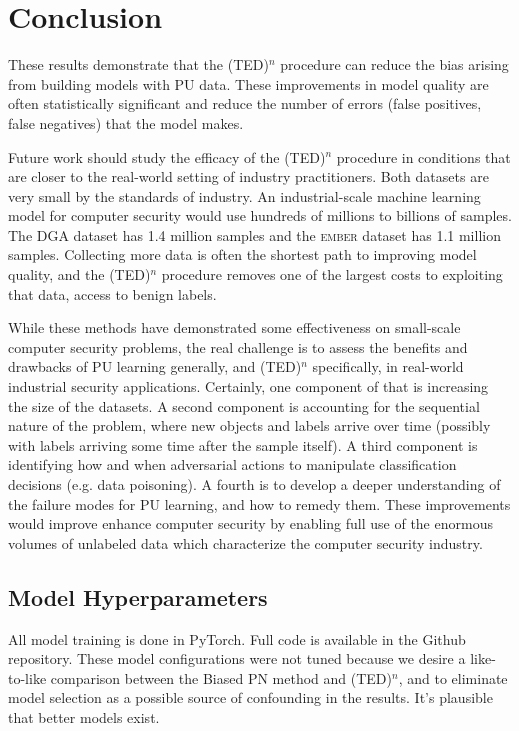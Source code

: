 \documentclass[conference]{IEEEtran}
\begin{document}
\section{Conclusion}
\label{sec:conclude}

    These results demonstrate that the (TED)${}^n$ procedure can reduce the bias arising from building models with PU data. These improvements in model quality are often statistically significant and reduce the number of errors (false positives, false negatives) that the model makes. 

    Future work should study the efficacy of the (TED)${}^n$ procedure in conditions that are closer to the real-world setting of industry practitioners. Both datasets are very small by the standards of industry. An industrial-scale machine learning model for computer security would use hundreds of millions to billions of samples. The DGA dataset has 1.4 million samples and the \textsc{ember} dataset has 1.1 million samples. Collecting more data is often the shortest path to improving model quality, and the (TED)${}^n$ procedure removes one of the largest costs to exploiting that data, access to benign labels.

    While these methods have demonstrated some effectiveness on small-scale computer security problems, the real challenge is to assess the benefits and drawbacks of PU learning generally, and (TED)${}^n$ specifically, in real-world industrial security applications. Certainly, one component of that is increasing the size of the datasets. A second component is accounting for the sequential nature of the problem, where new objects and labels arrive over time (possibly with labels arriving some time after the sample itself). A third component is identifying how and when adversarial actions to manipulate classification decisions (e.g. data poisoning). A fourth is to develop a deeper understanding of the failure modes for PU learning, and how to remedy them. These improvements would improve enhance computer security by enabling full use of the enormous volumes of unlabeled data which characterize the computer security industry.



\appendix

\subsection{Model Hyperparameters}
\label{appendix:hyperparams}
    All model training is done in PyTorch. Full code is available in the Github repository. These model configurations were not tuned because we desire a like-to-like comparison between the Biased PN method and (TED)${}^n$, and to eliminate model selection as a possible source of confounding in the results. It's plausible that better models exist.
\end{document}
